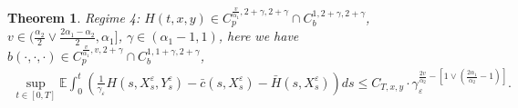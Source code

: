 \documentclass[11pt,reqno]{amsart}
\newtheorem{theorem}{\indent Theorem}[section]
\numberwithin{equation}{section}
\begin{document}
\begin{theorem}
	Regime 4:  $H(t,x,y)\in C_{p}^{\frac{v}{\alpha_{1}},2+\gamma,2+\gamma}\cap C_{b}^{1,2+\gamma,2+\gamma}$,  $v\in ( \frac{\alpha_{2}}{2}\vee \frac{2\alpha_{1}-\alpha_{2}}{2}  ,\alpha_{1}]$, $\gamma\in(\alpha_{1}-1,1)$, here we have $b(\cdot,\cdot,\cdot)\in C_{p}^{\frac{v}{\alpha_{1}},v,2+\gamma}\cap C_{b}^{1,1+\gamma,2+\gamma}$,
	\begin{equation}\label{6.40}
		\begin{split}
			 \sup_{t\in [0,T]}\mathbb{E} \int_{0}^{t}\left(  \frac{1}{\gamma_{\varepsilon}}H(s,X_{s}^{\varepsilon},Y_{s}^{\varepsilon})- \bar{c}(s,X_{s}^{\varepsilon})-\bar{H}(s,X_{s}^{\varepsilon})\right)ds\leq C_{T,x,y}\cdot \gamma_{\varepsilon}^{\frac{2v}{\alpha_{2}}-\left[ 1\vee \left( \frac{2\alpha_{1}}{\alpha_{2}}-1\right)   \right] }.
		\end{split}
	\end{equation}
\end{theorem}
\end{document}
